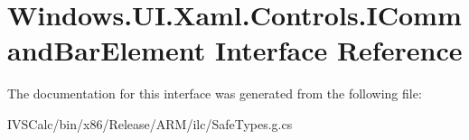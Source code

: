 \hypertarget{interface_windows_1_1_u_i_1_1_xaml_1_1_controls_1_1_i_command_bar_element}{}\section{Windows.\+U\+I.\+Xaml.\+Controls.\+I\+Command\+Bar\+Element Interface Reference}
\label{interface_windows_1_1_u_i_1_1_xaml_1_1_controls_1_1_i_command_bar_element}


The documentation for this interface was generated from the following file\+:\begin{DoxyCompactItemize}
\item 
I\+V\+S\+Calc/bin/x86/\+Release/\+A\+R\+M/ilc/Safe\+Types.\+g.\+cs\end{DoxyCompactItemize}
